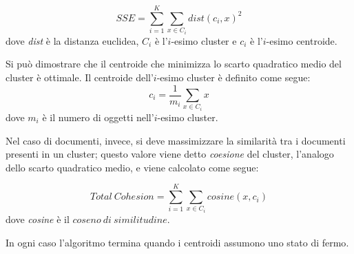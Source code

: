 \begin{equation*}
	SSE = \sum_{i=1}^{K}{\sum_{x \in C_i} {dist(c_i, x)^2}}
\end{equation*}
dove \emph{dist} è la distanza euclidea, $C_i$ è l'$i$-esimo cluster e $c_i$ è l'$i$-esimo centroide.

Si può dimostrare che il centroide che minimizza lo scarto quadratico medio del cluster è ottimale. Il centroide dell'$i$-esimo cluster è definito come segue:
\begin{equation*}
	c_i = \frac{1}{m_i} \sum_{x \in C_i}{x}
\end{equation*}
dove $m_i$ è il numero di oggetti nell'$i$-esimo cluster.

Nel caso di documenti, invece, si deve massimizzare la similarità tra i documenti presenti in un cluster; questo valore viene detto \emph{coesione} del cluster, l'analogo dello scarto quadratico medio, e viene calcolato come segue:

\begin{equation*}
	Total\ Cohesion = \sum_{i=1}^{K}{\sum_{x \in C_i} {cosine(x, c_i)}}
\end{equation*}
dove \emph{cosine} è il $coseno\ di\ similitudine$.

In ogni caso l'algoritmo termina quando i centroidi assumono uno stato di fermo\cite{k-means}. 
